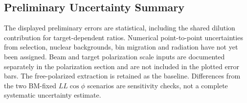 \subsection{Preliminary Uncertainty Summary}
The displayed preliminary errors are statistical, including the shared dilution contribution for target-dependent ratios. Numerical point-to-point uncertainties from selection, nuclear backgrounds, bin migration and radiation have not yet been assigned. Beam and target polarization scale inputs are documented separately in the polarization section and are not included in the plotted error bars. The free-polarized extraction is retained as the baseline. Differences from the two BM-fixed $LL\cos\phi$ scenarios are sensitivity checks, not a complete systematic uncertainty estimate.
